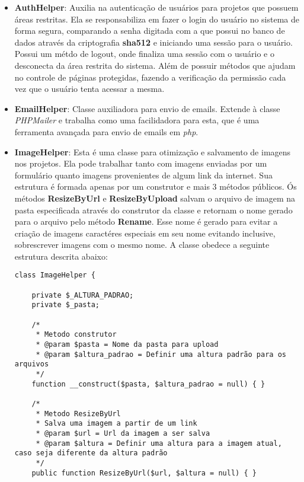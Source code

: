             \begin{itemize}
                \item\textbf{AuthHelper}: Auxilia na autenticação de usuários para projetos que possuem áreas restritas. Ela se responsabiliza em fazer o login do usuário no sistema de forma segura, comparando a senha digitada com a que possui no banco de dados através da criptografia \textbf{sha512} e iniciando uma sessão para o usuário. Possui um métdo de logout, onde finaliza uma sessão com o usuário e o desconecta da área restrita do sistema. Além de possuir métodos que ajudam no controle de páginas protegidas, fazendo a verificação da permissão cada vez que o usuário tenta acessar a mesma.

                \item\textbf{EmailHelper}: Classe auxiliadora para envio de emails. Extende à classe \emph{PHPMailer} e trabalha como uma facilidadora para esta, que é uma ferramenta avançada para envio de emails em \emph{php}.

                \item\textbf{ImageHelper}: Esta é uma classe para otimização e salvamento de imagens nos projetos. Ela pode trabalhar tanto com imagens enviadas por um formulário quanto imagens provenientes de algum link da internet. Sua estrutura é formada apenas por um construtor e mais 3 métodos públicos. Ós métodos \textbf{ResizeByUrl} e \textbf{ResizeByUpload} salvam o arquivo de imagem na pasta especificada através do construtor da classe e retornam o nome gerado para o arquivo pelo método \textbf{Rename}. Esse nome é gerado para evitar a criação de imagens caractéres especiais em seu nome evitando inclusive, sobrescrever imagens com o mesmo nome. A classe obedece a seguinte estrutura descrita abaixo:

\begin{lstlisting}
class ImageHelper {

    private $_ALTURA_PADRAO;
    private $_pasta;

    /*
     * Metodo construtor
     * @param $pasta = Nome da pasta para upload
     * @param $altura_padrao = Definir uma altura padrão para os arquivos
     */
    function __construct($pasta, $altura_padrao = null) { }

    /*
     * Metodo ResizeByUrl
     * Salva uma imagem a partir de um link
     * @param $url = Url da imagem a ser salva
     * @param $altura = Definir uma altura para a imagem atual, caso seja diferente da altura padrão
     */
    public function ResizeByUrl($url, $altura = null) { }


\end{lstlisting}
\end{itemize}

